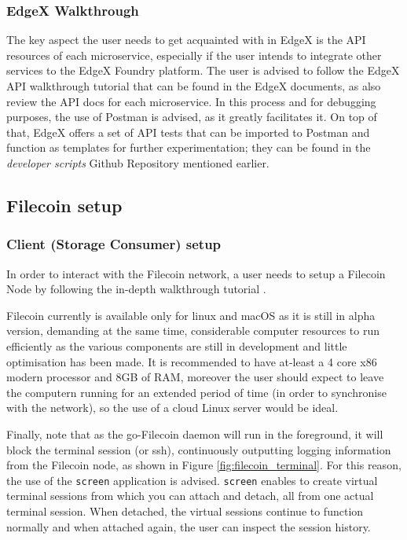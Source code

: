 \bigskip
\noindent
\subsubsection{EdgeX Walkthrough}
The key aspect the user needs to get acquainted with in EdgeX is the API resources of each microservice, especially if the user intends to integrate other services to the EdgeX Foundry platform. The user is advised to follow the EdgeX API walkthrough tutorial that can be found in the EdgeX documents\cite{edgex-api}, as also review the API docs for each microservice. In this process and for debugging purposes, the use of Postman is advised, as it greatly facilitates it. On top of that, EdgeX offers a set of API tests that can be imported to Postman and function as templates for further experimentation; they can be found in the \textit{developer scripts} Github Repository mentioned earlier.

\subsection{Filecoin setup}

\subsubsection{Client (Storage Consumer) setup} \label{sub:filecoin-client-setup}

In order to interact with the Filecoin network, a user needs to setup a Filecoin Node by following the in-depth walkthrough tutorial \cite{filecoin-walkthrough}.

Filecoin currently is available only for linux and macOS as it is still in alpha version, demanding at the same time, considerable computer resources to run efficiently as the various components are still in development and little optimisation has been made. It is recommended to have at-least a 4 core x86 modern processor and 8GB of RAM, moreover the user should expect to leave the computern running for an extended period of time (in order to synchronise with the network), so the use of a cloud Linux server would be ideal. 

Finally, note that as the go-Filecoin daemon will run in the foreground, it will block the terminal session (or ssh), continuously outputting logging information from the Filecoin node, as shown in Figure \ref{fig:filecoin_terminal}. For this reason, the use of the \texttt{screen} application is advised. \texttt{screen} enables to create virtual terminal sessions from which you can attach and detach, all from one actual terminal session. When detached, the virtual sessions continue to function normally and when attached again, the user can inspect the session history.

